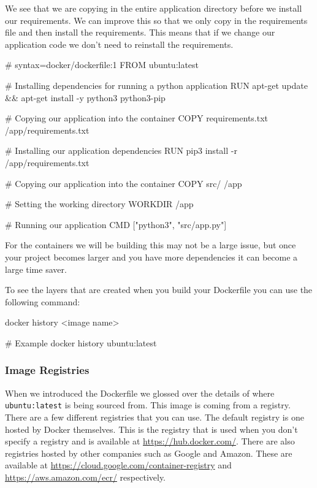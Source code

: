 \documentclass{csse4400}
\begin{document}
We see that we are copying in the entire application directory before we install our requirements. We can improve this so that we only copy in the requirements file and then install the requirements. This means that if we change our application code we don't need to reinstall the requirements.

\begin{code}[language=docker,numbers=none]{}
  # syntax=docker/dockerfile:1
  FROM ubuntu:latest

  # Installing dependencies for running a python application
  RUN apt-get update && apt-get install -y python3 python3-pip

  # Copying our application into the container
  COPY requirements.txt /app/requirements.txt

  # Installing our application dependencies
  RUN pip3 install -r /app/requirements.txt

  # Copying our application into the container
  COPY src/ /app

  # Setting the working directory
  WORKDIR /app

  # Running our application
  CMD ["python3", "src/app.py"]
\end{code}

For the containers we will be building this may not be a large issue, but once your project becomes larger and you have more dependencies it can become a large time saver.

To see the layers that are created when you build your Dockerfile you can use the following command:

\begin{code}[language=bash,numbers=none]{}
  docker history <image name>

  # Example
  docker history ubuntu:latest
\end{code}


\subsubsection{Image Registries}

When we introduced the Dockerfile we glossed over the details of where \texttt{ubuntu:latest} is being sourced from. This image is coming from a registry. There are a few different registries that you can use. The default registry is one hosted by Docker themselves. This is the registry that is used when you don't specify a registry and is available at \url{https://hub.docker.com/}. There are also registries hosted by other companies such as Google and Amazon. These are available at \url{https://cloud.google.com/container-registry} and \url{https://aws.amazon.com/ecr/} respectively.
\end{document}
